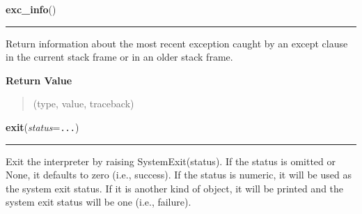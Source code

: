     \label{sys:exc_info}

    \vspace{0.5ex}

\hspace{.8\funcindent}\begin{boxedminipage}{\funcwidth}

    \raggedright \textbf{exc\_info}()

    \vspace{-1.5ex}

    \rule{\textwidth}{0.5\fboxrule}
\setlength{\parskip}{2ex}
    Return information about the most recent exception caught by an except 
    clause in the current stack frame or in an older stack frame.

\setlength{\parskip}{1ex}
      \textbf{Return Value}
    \vspace{-1ex}

      \begin{quote}
      (type, value, traceback)

      \end{quote}

    \end{boxedminipage}

    \label{sys:exit}

    \vspace{0.5ex}

\hspace{.8\funcindent}\begin{boxedminipage}{\funcwidth}

    \raggedright \textbf{exit}(\textit{status}={\tt ...})

    \vspace{-1.5ex}

    \rule{\textwidth}{0.5\fboxrule}
\setlength{\parskip}{2ex}
    Exit the interpreter by raising SystemExit(status). If the status is 
    omitted or None, it defaults to zero (i.e., success). If the status is 
    numeric, it will be used as the system exit status. If it is another 
    kind of object, it will be printed and the system exit status will be 
    one (i.e., failure).

\setlength{\parskip}{1ex}
    \end{boxedminipage}

    \label{sys:getcheckinterval}

